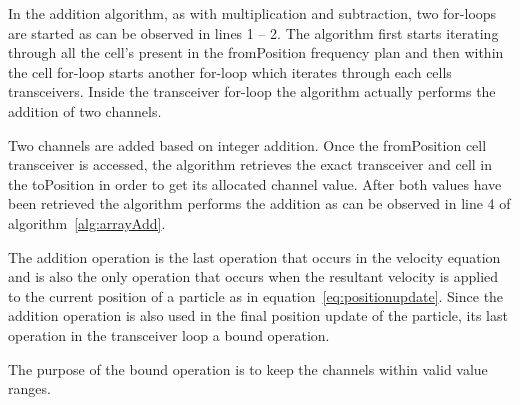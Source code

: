 In the addition algorithm, as with multiplication and subtraction, two for-loops are started as can be observed in lines 1 -- 2. The algorithm first starts iterating through all the cell's present in the fromPosition frequency plan and then within the cell for-loop starts another for-loop which iterates through each cells transceivers. Inside the transceiver for-loop the algorithm actually performs the addition of two channels.

Two channels are added based on integer addition. Once the fromPosition cell transceiver is accessed, the algorithm retrieves the exact transceiver and cell in the toPosition in order to get its allocated channel value. After both values have been retrieved the algorithm performs the addition as can be observed in line 4 of algorithm~\ref{alg:arrayAdd}.

The addition operation is the last operation that occurs in the velocity equation and is also the only operation that occurs when the resultant velocity is applied to the current position of a particle as in equation~\ref{eq:positionupdate}. Since the addition operation is also used in the final position update of the particle, its last operation in the transceiver loop a bound operation. 

The purpose of the bound operation is to keep the channels within valid value ranges.

